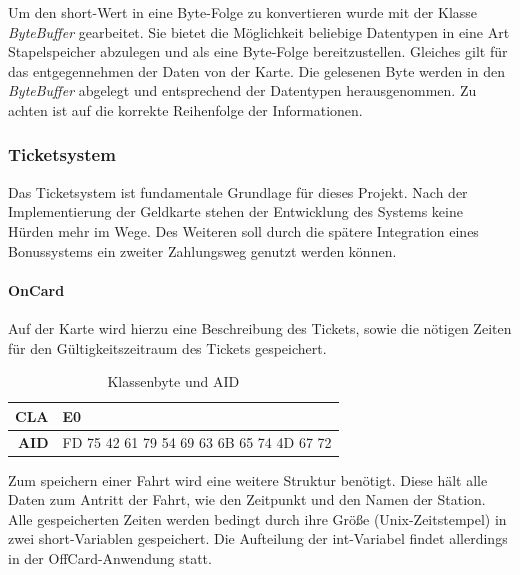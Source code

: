\documentclass[	a4paper,
			11pt,
			oneside,
			parskip]{scrartcl}
\begin{document}
Um den short-Wert in eine Byte-Folge zu konvertieren wurde mit der Klasse \textit{ByteBuffer} gearbeitet. Sie bietet die Möglichkeit beliebige Datentypen in eine Art Stapelspeicher abzulegen und als eine Byte-Folge bereitzustellen. Gleiches gilt für das entgegennehmen der Daten von der Karte. Die gelesenen Byte werden in den \textit{ByteBuffer} abgelegt und entsprechend der Datentypen herausgenommen. Zu achten ist auf die korrekte Reihenfolge der Informationen.

\subsubsection{Ticketsystem}

Das Ticketsystem ist fundamentale Grundlage für dieses Projekt. Nach der Implementierung der Geldkarte stehen der Entwicklung des Systems keine Hürden mehr im Wege. Des Weiteren soll durch die spätere Integration eines Bonussystems ein zweiter Zahlungsweg genutzt werden können. 

\paragraph{OnCard} Auf der Karte wird hierzu eine Beschreibung des Tickets, sowie die nötigen Zeiten für den Gültigkeitszeitraum des Tickets gespeichert.

\begin{table}[htbp]
  \centering
  \caption{Klassenbyte und AID}
    \begin{tabular}{rr}
    \toprule
    \textbf{CLA} & \multicolumn{1}{l}{E0} \\
    \midrule
    \textbf{AID} & FD 75 42 61 79 54 69 63 6B 65 74 4D 67 72 \\
    \bottomrule
    \end{tabular}%
  \label{tab:ticketaid}%
\end{table}%

Zum speichern einer Fahrt wird eine weitere Struktur benötigt. Diese hält alle Daten zum Antritt der Fahrt, wie den Zeitpunkt und den Namen der Station. Alle gespeicherten Zeiten werden bedingt durch ihre Größe (Unix-Zeitstempel) in zwei short-Variablen gespeichert. Die Aufteilung der int-Variabel findet allerdings in der OffCard-Anwendung statt.
\end{document}
